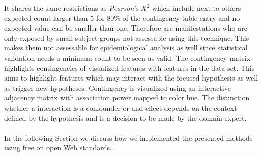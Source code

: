 \documentclass[journal]{style/vgtc} 			          %
\begin{document}
It shares the same restrictions as \emph{Pearson's $X^2$} which include next to others expected count larger than 5 for $80\%$ of the contingency table entry and no expected value can be smaller than one.
%
Therefore are manifestations who are only exposed by small subject groups not assessable using this technique.
%
This makes them not assessable for epidemiological analysis as well since statistical validation needs a minimum count to be seen as valid.
The contingency matrix highlights contingencies of visualized features with features in the data set.
%
This aims to highlight features which may interact with the focused hypothesis as well as trigger new hypotheses.
%
Contingency is visualized using an interactive adjacency matrix with association power mapped to color hue.
%
The distinction whether a interaction is a confounder or and effect depends on the context defined by the hypothesis and is a decision to be made by the domain expert.
\\\\
In the following Section we discuss how we implemented the presented methods using free on open Web standards.
% 
\end{document}
